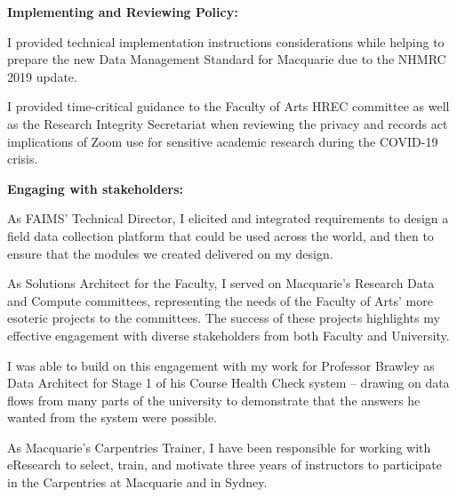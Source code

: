 \documentclass[11pt, a4paper]{awesome-cv}
\begin{document}
\begin{cvletter}

\textbf{Implementing and Reviewing Policy:} 
\begin{letteritems}
\item {I provided technical implementation instructions considerations while helping to prepare the new Data Management Standard for Macquarie due to the NHMRC 2019 update.}
\item {I provided time-critical guidance to the Faculty of Arts HREC committee as well as the Research Integrity Secretariat when reviewing the privacy and records act implications of Zoom use for sensitive academic research during the COVID-19 crisis.}
\end{letteritems}


\textbf{Engaging with stakeholders:} 
\begin{letteritems}
\item {As FAIMS' Technical Director, I elicited and integrated requirements to design a field data collection platform that could be used across the world, and then to ensure that the modules we created delivered on my design.} 
\item {As Solutions Architect for the Faculty, I served on Macquarie's Research Data and Compute committees, representing the needs of the Faculty of Arts' more esoteric projects to the committees. The success of these projects highlights my effective engagement with diverse stakeholders from both Faculty and University.}
\item {I was able to build on this engagement with my work for Professor Brawley as Data Architect for Stage 1 of his Course Health Check system -- drawing on data flows from many parts of the university to demonstrate that the answers he wanted from the system were possible.}
\item {As Macquarie's Carpentries Trainer, I have been responsible for working with eResearch to select, train, and motivate three years of instructors to participate in the Carpentries at Macquarie and in Sydney.}
\end{letteritems}



\end{cvletter}
\end{document}
